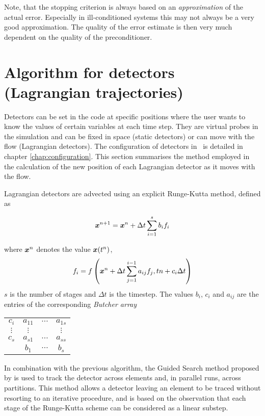 Note, that the stopping criterion is always based on an \emph{approximation}
of the actual error. Especially in ill-conditioned systems this may not
always be a very good approximation. The quality of the error estimate is
then very much dependent on the quality of the preconditioner.

\section{Algorithm for detectors (Lagrangian trajectories)}
 
Detectors can be set in the code at specific positions where the user wants
to know the values of certain variables at each time step. They are virtual
probes in the simulation and can be fixed in space (static detectors) or can
move with the flow (Lagrangian detectors). The configuration of detectors in
\fluidity\ is detailed in chapter
\ref{chap:configuration}. This section summarises the method
employed in the calculation of the new position of each Lagrangian detector
as it moves with the flow.

Lagrangian detectors are advected using an explicit Runge-Kutta method, defined as

\begin{equation}\label{eq:detectors_RK}
{\mbox{\boldmath$x$}}^{n+1} =  {\mbox{\boldmath$x$}}^{n} + \Delta t \sum_{i=1}^{s} b_i f_i
\end{equation}

where ${\mbox{\boldmath$x$}}^{n}$ denotes the value ${\mbox{\boldmath$x$}}(t^n)$, 
\begin{equation}\label{eq:detectors_RK_fi}
f_i = f \left({\mbox{\boldmath$x$}}^{n}+ \Delta t \sum_{j=1}^{i-1} a_{ij} f_j, t{n}+c_i\Delta t\right)
\end{equation}
$s$ is the number of stages and $\Delta t$ is the timestep. The values $b_i$,
$c_i$ and $a_{ij}$ are the entries of the corresponding \emph{Butcher array}

\begin{center}
\begin{tabular}{ c|c c c }
 $c_i$ & $a_{11}$ & $\cdots$ & $a_{1s}$ \\
 $\vdots$ & $\vdots$ & & $\vdots$ \\
 $c_s$ & $a_{s1}$ & $\cdots$ & $a_{ss}$ \\
\hline
  & $b_1$ & $\cdots$ & $b_s$
\end{tabular}
\end{center}

In combination with the previous algorithm, the Guided Search method proposed by \citet{coppola2001}
is used to track the detector across elements and, in parallel runs, across partitions. 
This method allows a detector leaving an element to be traced without resorting to an iterative procedure,
and is based on the observation that each stage of the Runge-Kutta scheme can be considered as a linear substep.

